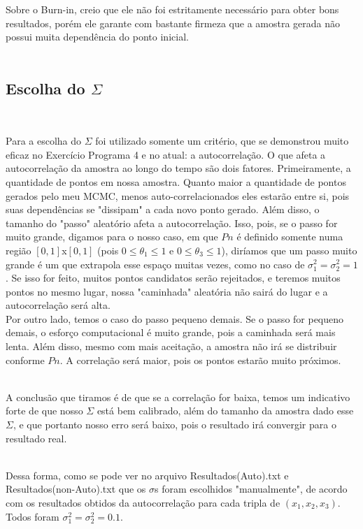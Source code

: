 \documentclass[pt12]{article}
\begin{document}
Sobre o Burn-in, creio que ele não foi estritamente necessário para obter bons resultados, porém ele garante com bastante firmeza que a amostra gerada não possui muita dependência do ponto inicial.\\
\ 

\subsection{Escolha do $\Sigma$}
\ 

Para a escolha do $\Sigma$ foi utilizado somente um critério, que se demonstrou muito eficaz no Exercício Programa 4 e no atual: a autocorrelação. O que afeta a autocorrelação da amostra ao longo do tempo são dois fatores. Primeiramente, a quantidade de pontos em nossa amostra. Quanto maior a quantidade de pontos gerados pelo meu MCMC, menos auto-correlacionados eles estarão entre si, pois suas dependências se "dissipam" a cada novo ponto gerado.
Além disso, o tamanho do "passo" aleatório afeta a autocorrelação. Isso, pois, se o passo for muito grande, digamos para o nosso caso, em que $Pn$ é definido somente numa região $[0,1]$x$[0,1]$ (pois $0\leq\theta_1\leq1$ e $0\leq\theta_3\leq1$), diríamos que um passo muito grande é um que extrapola esse espaço muitas vezes, como no caso de $\sigma_1^2 = \sigma_2^2 = 1$. Se isso for feito, muitos pontos candidatos serão rejeitados, e teremos muitos pontos no mesmo lugar, nossa "caminhada" aleatória não sairá do lugar e a autocorrelação será alta.\\
Por outro lado, temos o caso do passo pequeno demais. Se o passo for pequeno demais, o esforço computacional é muito grande, pois a caminhada será mais lenta. Além disso, mesmo com mais aceitação, a amostra não irá se distribuir conforme $Pn$. A correlação será maior, pois os pontos estarão muito próximos.\\
\ 

A conclusão que tiramos é de que se a correlação for baixa, temos um indicativo forte de que nosso $\Sigma$ está bem calibrado, além do tamanho da amostra dado esse $\Sigma$, e que portanto nosso erro será baixo, pois o resultado irá convergir para o resultado real.\\
\ 

Dessa forma, como se pode ver no arquivo Resultados(Auto).txt e Resultados(non-Auto).txt que os $\sigma$s foram escolhidos "manualmente", de acordo com os resultados obtidos da autocorrelação para cada tripla de $(x_1,x_2,x_3)$. Todos foram $\sigma_1^2 = \sigma_2^2 = 0.1.$\\
\ 
\end{document}
